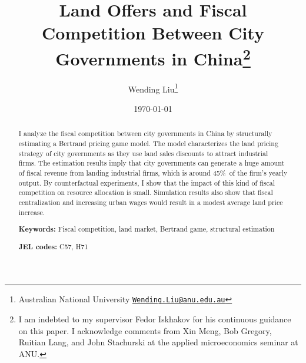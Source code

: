 \documentclass[11pt, english]{article}
\theoremstyle{plain}
\theoremstyle{definition}
\newcommand\estbetapercent{45\%}
\begin{document}
\title{Land Offers and Fiscal Competition Between City Governments in China\thanks{
    I am
    indebted to my supervisor Fedor Iskhakov for
    his continuous guidance on this paper.
    I acknowledge comments from Xin Meng, Bob Gregory, Ruitian Lang, and John Stachurski
    at the applied microeconomics seminar at ANU.}
}

\date{\monthyeardate\today}

\author{Wending Liu\thanks{ Australian National University
    \href{mailto:Wending.Liu@anu.edu.au}{\texttt{Wending.Liu@anu.edu.au}}}
}
\maketitle

\noindent \begin{center}
  \par\end{center}

\begin{abstract}
  I analyze the fiscal competition between city governments in China
  by structurally estimating a Bertrand pricing game model.
  The model characterizes the land pricing strategy of city governments as they use land
  sales discounts to attract industrial firms.
  The estimation results imply that city governments can generate a huge amount of fiscal revenue
  from landing industrial firms,
  which is around \estbetapercent ~of the firm's yearly output.
  By counterfactual experiments, I show that
  the impact of this kind of fiscal competition on resource allocation
  is small. Simulation results also show that fiscal
  centralization and increasing urban wages would result in a modest
  average land price increase.


  \bigskip{}


  \noindent \textbf{Keywords:} Fiscal competition, land market, Bertrand game,
  structural estimation

  \smallskip{}


  \noindent \textbf{JEL codes:} C57, H71

  \bigskip{}

\end{abstract}

\clearpage{}
\end{document}

